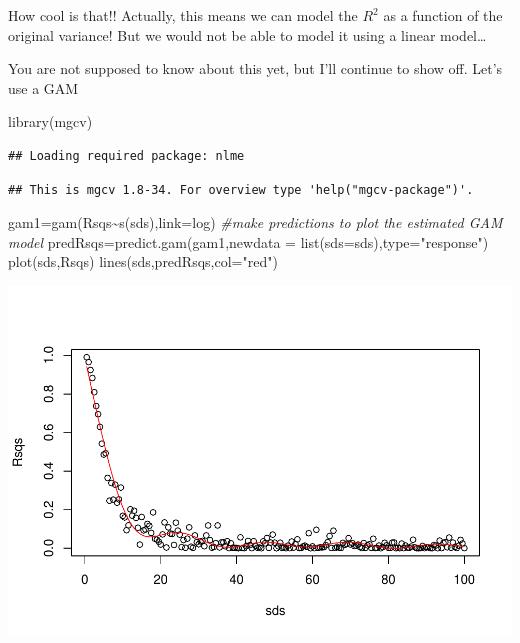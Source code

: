 \documentclass[
]{book}
\newenvironment{Shaded}{\begin{snugshade}}{\end{snugshade}}
\newcommand{\AttributeTok}[1]{\textcolor[rgb]{0.77,0.63,0.00}{#1}}
\newcommand{\CommentTok}[1]{\textcolor[rgb]{0.56,0.35,0.01}{\textit{#1}}}
\newcommand{\FunctionTok}[1]{\textcolor[rgb]{0.00,0.00,0.00}{#1}}
\newcommand{\NormalTok}[1]{#1}
\newcommand{\OtherTok}[1]{\textcolor[rgb]{0.56,0.35,0.01}{#1}}
\newcommand{\SpecialCharTok}[1]{\textcolor[rgb]{0.00,0.00,0.00}{#1}}
\newcommand{\StringTok}[1]{\textcolor[rgb]{0.31,0.60,0.02}{#1}}
\begin{document}
How cool is that!! Actually, this means we can model the \(R^2\) as a function of the original variance! But we would not be able to model it using a linear model\ldots{}

You are not supposed to know about this yet, but I'll continue to show off. Let's use a GAM

\begin{Shaded}
\begin{Highlighting}[]
\FunctionTok{library}\NormalTok{(mgcv)}
\end{Highlighting}
\end{Shaded}

\begin{verbatim}
## Loading required package: nlme
\end{verbatim}

\begin{verbatim}
## This is mgcv 1.8-34. For overview type 'help("mgcv-package")'.
\end{verbatim}

\begin{Shaded}
\begin{Highlighting}[]
\NormalTok{gam1}\OtherTok{=}\FunctionTok{gam}\NormalTok{(Rsqs}\SpecialCharTok{\textasciitilde{}}\FunctionTok{s}\NormalTok{(sds),}\AttributeTok{link=}\NormalTok{log)}
\CommentTok{\#make predictions to plot the estimated GAM model}
\NormalTok{predRsqs}\OtherTok{=}\FunctionTok{predict.gam}\NormalTok{(gam1,}\AttributeTok{newdata =} \FunctionTok{list}\NormalTok{(}\AttributeTok{sds=}\NormalTok{sds),}\AttributeTok{type=}\StringTok{"response"}\NormalTok{)}
\FunctionTok{plot}\NormalTok{(sds,Rsqs)}
\FunctionTok{lines}\NormalTok{(sds,predRsqs,}\AttributeTok{col=}\StringTok{"red"}\NormalTok{)}
\end{Highlighting}
\end{Shaded}

\includegraphics{ECOMODbook_files/figure-latex/a6.32-1.pdf}
\end{document}
